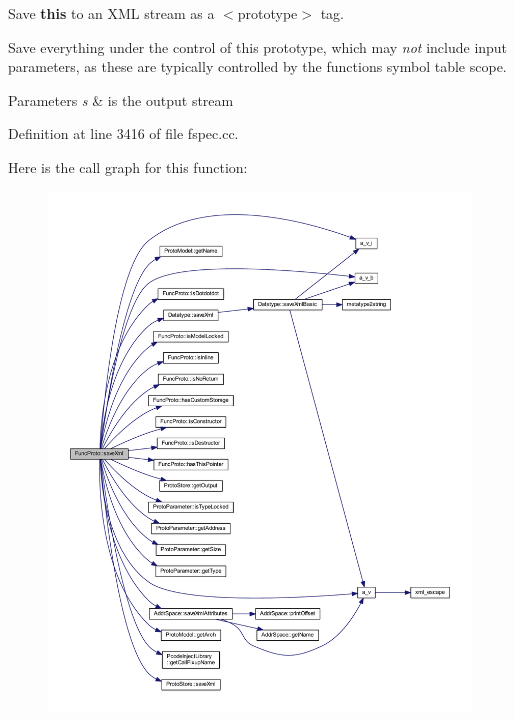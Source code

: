 Save {\bfseries{this}} to an X\+ML stream as a $<$prototype$>$ tag. 

Save everything under the control of this prototype, which may {\itshape not} include input parameters, as these are typically controlled by the function\textquotesingle{}s symbol table scope. 
\begin{DoxyParams}{Parameters}
{\em s} & is the output stream \\
\hline
\end{DoxyParams}


Definition at line 3416 of file fspec.\+cc.

Here is the call graph for this function\+:
\nopagebreak
\begin{figure}[H]
\begin{center}
\leavevmode
\includegraphics[width=350pt]{class_func_proto_a4da5ce755480a4eded9bedff2c6e274f_cgraph}
\end{center}
\end{figure}
\mbox{\label{class_func_proto_a1ff2f80e5cf4043147ccd83a863ee83f}} 
